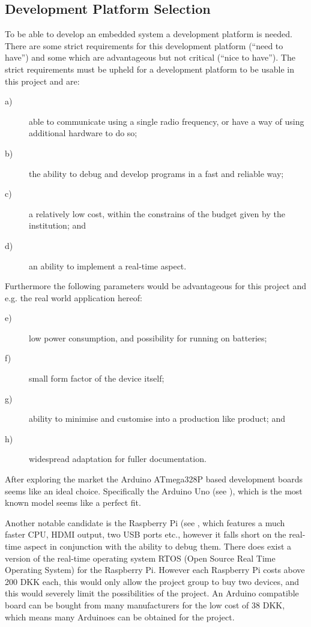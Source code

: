 
\subsection{Development Platform Selection}
To be able to develop an embedded system a development platform is needed. 
There are some strict requirements for this development platform (``need to have'') and some which are advantageous but not critical (``nice to have'').
The strict requirements must be upheld for a development platform to be usable in this project and are:
\begin{description}
\item[a)] able to communicate using a single radio frequency, or have a way of using additional hardware to do so;
\item[b)] the ability to debug and develop programs in a fast and reliable way;
\item[c)] a relatively low cost, within the constrains of the budget given by the institution;
and
\item[d)] an ability to implement a real-time aspect.
\end{description}

Furthermore the following parameters would be advantageous for this project and e.g. the real world application hereof:
\begin{description}
\item[e)] low power consumption, and possibility for running on batteries;
\item[f)] small form factor of the device itself;
\item[g)] ability to minimise and customise into a production like product;
and
\item[h)] widespread adaptation for fuller documentation.
\end{description}

\bigskip
{}
After exploring the market the Arduino ATmega328P based development boards seems like an ideal choice.
Specifically the Arduino Uno (see \cite{ArduinoUNO}), which is the most known model seems like a perfect fit.

Another notable candidate is the Raspberry Pi (see \cite{RaspberryPI}, which features a much faster CPU, HDMI output, two USB ports etc., however it falls short on the real-time aspect in conjunction with the ability to debug them. 
There does exist a version of the real-time operating system RTOS (Open Source Real Time Operating System) for the Raspberry Pi.
However each Raspberry Pi costs above 200 DKK each, this would only allow the project group to buy two devices, and this would severely limit the possibilities of the project.
An Arduino compatible board can be bought from many manufacturers for the low cost of 38 DKK, which means many Arduinoes can be obtained for the project.

